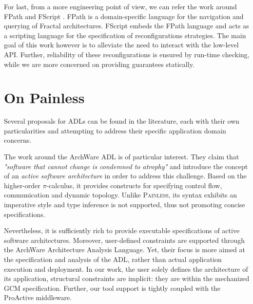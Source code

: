 

	For last, from a more engineering point of view, we can refer the work around FPath and FScript \cite{journals/adt/DavidLLC09}.
	FPath is a domain-specific language for the navigation and querying of Fractal architectures. FScript embeds the FPath
	language and acts as a scripting language for the specification of reconfigurations strategies. The main goal of this
	work however is to alleviate the need to interact with the low-level API. Further, reliability of these reconfigurations
	is ensured by run-time checking, while we are more concerned on providing guarantees statically.
	


\section{On Painless}
\label{sec:relpainless}

	Several proposals for \ac{ADL}s can be found in the literature, each with their own 
	particularities and attempting to 
	address their specific application domain concerns. 
	
	The work around the ArchWare \ac{ADL} \cite{DBLP:journals/corr/abs-1006-4829} 
	is of particular interest. They claim that 
	\textit{"software that cannot change is condemned to atrophy"}	
	and introduce the concept of an \textit{active software architecture} in order
	to address this challenge. Based on the higher-order $\pi$-calculus, it provides
	constructs for specifying control flow, communication and dynamic topology.
	Unlike \textsc{Painless}, its syntax exhibits an imperative style 
	and type inference is not supported, thus not promoting concise specifications. 
	
	Nevertheless, it is sufficiently rich to provide executable specifications of active software
	architectures. Moreover, user-defined constraints are supported through the ArchWare 
	Architecture Analysis Language. Yet, their focus is more aimed at the specification
	and analysis of the \ac{ADL}, rather than actual application execution and deployment.
	In our work, the user solely defines the architecture of its application, structural constraints
	are implicit: they are within the mechanized \ac{GCM} specification.	Further, our tool support
	is tightly coupled with the ProActive middleware.
	
